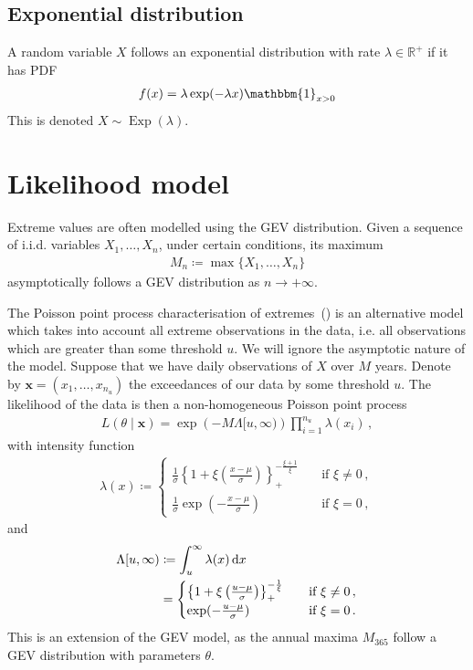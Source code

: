 \documentclass{article}
\newcommand{\R}{\mathbb{R}}
\newcommand{\dd}{{\rm d}}
\begin{document}
\subsection{Exponential distribution}
%

%
A random variable $X$ follows an exponential distribution
with rate $\lambda \in \R^+$ if it has PDF
%
\begin{align*}
	f(x) = \lambda \exp(-\lambda x) \mathbbm{1}_{x > 0}
\end{align*}
%
This is denoted $X \sim \operatorname{Exp}(\lambda)$.
%
\section{Likelihood model}
\label{section:model}
%

%
Extreme values are often modelled using the GEV distribution.
Given a sequence of i.i.d. variables $X_1, \dots, X_n$,
under certain conditions,
its maximum
\begin{align*}
	M_n \coloneqq \max\{X_1, \dots, X_{n}\}
\end{align*}
asymptotically follows a GEV distribution as $n \to +\infty$.
%

%
The Poisson point process characterisation of extremes~(\cite{coles2001})
is an alternative model which takes into account
all extreme observations in the data,
i.e. all observations which are greater than some threshold $u$.
We will ignore the asymptotic nature of the model.
Suppose that we have daily observations of $X$ over $M$ years.
Denote by $\mathbf{x}=(x_1, \dots, x_{n_u})$
the exceedances of our data by some threshold $u$.
The likelihood of the data is then a non-homogeneous
Poisson point process
%
\begin{align}
	L(\theta \mid \mathbf{x})
		= \exp \left(-M \Lambda[u, \infty)\right)
		\prod_{i = 1}^{n_u} \lambda(x_i) \,,
	\label{eq:likelihood}
\end{align}
%
with intensity function
%
\begin{align}
	\lambda(x) \coloneqq
	\begin{cases}
		\frac{1}{\sigma}
			\left\{1 + \xi \left(\frac{x - \mu}{\sigma}\right)\right\}_+
			^ {-\frac{\xi + 1}{\xi}}
			&\quad \text{if $\xi \neq 0$} \,,\\
		\frac{1}{\sigma}\exp(-\frac{x - \mu}{\sigma})
			&\quad \text{if $\xi = 0$} \,,
	\end{cases}
	\label{eq:GP}
\end{align}
%
and
% 
\begin{align}
	\Lambda[u, \infty) &\coloneqq \int_u ^ \infty \lambda(x) \, \dd x \\
	&=
		\begin{cases}
			\left\{1 + \xi \left(\frac{u - \mu}{\sigma}\right)\right\}_+
			^ {-\frac{1}{\xi}}
			&\quad \text{if $\xi \neq 0$} \,,\\
			\exp(-\frac{u - \mu}{\sigma})
			&\quad \text{if $\xi = 0$} \,.
		\end{cases}
	\label{eq:Lambda}
\end{align}
%
This is an extension of the GEV model,
as the annual maxima $M_{365}$
follow a GEV distribution with parameters $\theta$.
%
\end{document}
